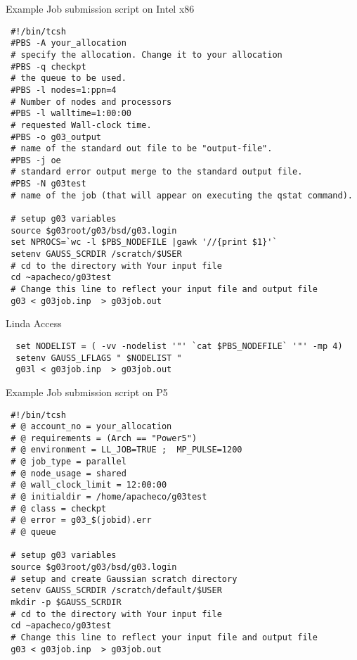 \documentclass[slidestop,mathserif,compress,xcolor=svgnames]{beamer}
\begin{document}
\begin{frame}[fragile]
\tiny{
\begin{exampleblock}{Example Job submission script on Intel x86}
{\color{white}
\begin{verbatim}
 #!/bin/tcsh
 #PBS -A your_allocation
 # specify the allocation. Change it to your allocation
 #PBS -q checkpt
 # the queue to be used. 
 #PBS -l nodes=1:ppn=4
 # Number of nodes and processors
 #PBS -l walltime=1:00:00
 # requested Wall-clock time.
 #PBS -o g03_output 
 # name of the standard out file to be "output-file".
 #PBS -j oe 
 # standard error output merge to the standard output file.
 #PBS -N g03test 
 # name of the job (that will appear on executing the qstat command).
 
 # setup g03 variables
 source $g03root/g03/bsd/g03.login
 set NPROCS=`wc -l $PBS_NODEFILE |gawk '//{print $1}'`
 setenv GAUSS_SCRDIR /scratch/$USER
 # cd to the directory with Your input file
 cd ~apacheco/g03test 
 # Change this line to reflect your input file and output file
 g03 < g03job.inp  > g03job.out
\end{verbatim}
}
\end{exampleblock}
\begin{alertblock}{Linda Access}
\begin{verbatim}
  set NODELIST = ( -vv -nodelist '"' `cat $PBS_NODEFILE` '"' -mp 4)
  setenv GAUSS_LFLAGS " $NODELIST "
  g03l < g03job.inp  > g03job.out
\end{verbatim}
\end{alertblock}
}
\end{frame}

\begin{frame}[fragile]
\tiny{
\begin{exampleblock}{Example Job submission script on P5}
{\color{white}
\begin{verbatim}
 #!/bin/tcsh
 # @ account_no = your_allocation
 # @ requirements = (Arch == "Power5")
 # @ environment = LL_JOB=TRUE ;  MP_PULSE=1200
 # @ job_type = parallel
 # @ node_usage = shared
 # @ wall_clock_limit = 12:00:00
 # @ initialdir = /home/apacheco/g03test
 # @ class = checkpt
 # @ error = g03_$(jobid).err
 # @ queue

 # setup g03 variables
 source $g03root/g03/bsd/g03.login
 # setup and create Gaussian scratch directory
 setenv GAUSS_SCRDIR /scratch/default/$USER
 mkdir -p $GAUSS_SCRDIR
 # cd to the directory with Your input file
 cd ~apacheco/g03test
 # Change this line to reflect your input file and output file
 g03 < g03job.inp  > g03job.out
\end{verbatim}
}
\end{exampleblock}
}
\end{frame}
\end{document}
